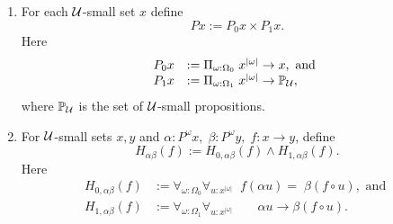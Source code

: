 \begin{defn}\label{defn:fo-notion-of-structure}
$\;$
\begin{enumerate}
\item For each $\mathcal{U}$-small set $x$ define 
  \[ Px := P_0x\times P_1x.\]  
Here
  \[ \begin{array}{ll}
 P_0x &:= \Pi_{\omega:\Omega_0}\; x^{|\omega|}\to x,
\mbox{ and } \\
     P_1x &:= \Pi_{\omega:\Omega_1}\; x^{|\omega|}\to \mathbb{P}_\mathcal{U},
  \end{array}\]
where $\mathbb{P}_\mathcal{U}$ is the set of $\mathcal{U}$-small propositions.
\item For $\mathcal{U}$-small sets $x,y$ and 
$\alpha:P^\omega x,\;\beta:P^\omega y,\; f:x\to y$, define
  \[ H_{\alpha\beta}(f) := H_{0,\alpha\beta}(f)\wedge H_{1,\alpha\beta}(f).\]
Here
  \[ \begin{array}{ll}
H_{0,\alpha\beta}(f) &:= 
\forall_{\omega:\Omega_0}\forall_{u:x^{|\omega|}}\;\; f(\alpha u)=\;\beta(f\circ u),
\mbox{ and }\\
H_{1,\alpha\beta}(f) &:= 
  \forall_{\omega:\Omega_1}\forall_{u:x^{|\omega|}}\;\;\;\;\;\;\;\alpha u\to\beta(f\circ u).
  \end{array}\]



\end{enumerate}
\end{defn}
